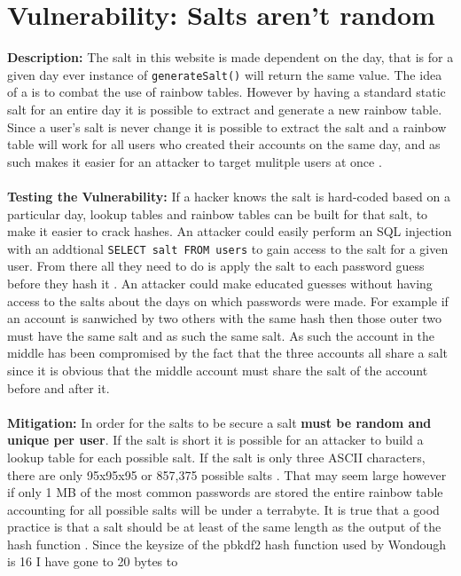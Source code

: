 \section{Vulnerability: Salts aren't random}
\label{sec:background}
\textbf{Description:} The salt in this website is made dependent on the day, that is for a given day ever instance of \verb|generateSalt()| will return the same value. The idea of a
is to combat the use of rainbow tables. However by having a standard static salt for an entire day it is possible to extract and generate a new rainbow table. Since a user's salt is
never change it is possible to extract the salt and a rainbow table will work for all users who created their accounts on the same day, and as such makes it easier for an attacker
to target mulitple users at once \cite{salts1}. \\ \\
\textbf{Testing the Vulnerability:} If a hacker knows the salt is hard-coded based on a particular day, lookup tables and rainbow tables can be built for that salt, to make it
easier to crack hashes. An attacker could easily perform an SQL injection with an addtional \verb|SELECT salt FROM users| to gain access to the salt for a given user. From there
all they need to do is apply the salt to each password guess before they hash it \cite{salts2}. An attacker could make educated guesses without having access to the salts about the days on which passwords were
made. For example if an account is sanwiched by two others with the same hash then those outer two must have the same salt and as such the same salt. As such the account in the 
middle has been compromised by the fact that the three accounts all share a salt since it is obvious that the middle account must share the salt of the account before and after
it.\\ \\
\textbf{Mitigation:} In order for the salts to be secure a salt \textbf{must be random and unique per user}. If the salt is short it is possible for an attacker to build a
lookup table for each possible salt. If the salt is only three ASCII characters, there are only 95x95x95 or 857,375 possible salts \cite{salts1}. That may seem large however if
only 1 MB of the most common passwords are stored the entire rainbow table accounting for all possible salts will be under a terrabyte. It is true that a good practice is that a
salt should be at least of the same length as the output of the hash function \cite{6516321}. Since the keysize of the pbkdf2 hash function used by Wondough is 16 I have gone to 20 bytes to
